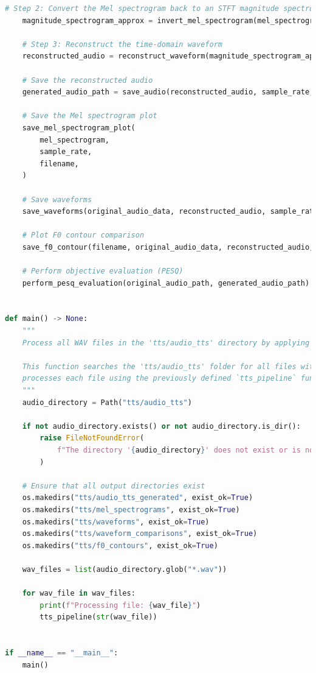 \documentclass[12pt]{article}
\begin{document}
\begin{lstlisting}[language=Python, basicstyle=\fontsize{8}{9}\ttfamily]
    # Step 2: Convert the Mel spectrogram back to an STFT magnitude spectrogram
    magnitude_spectrogram_approx = invert_mel_spectrogram(mel_spectrogram, sample_rate)

    # Step 3: Reconstruct the time-domain waveform
    reconstructed_audio = reconstruct_waveform(magnitude_spectrogram_approx)

    # Save the reconstructed audio
    generated_audio_path = save_audio(reconstructed_audio, sample_rate, filename)

    # Save the Mel spectrogram plot
    save_mel_spectrogram_plot(
        mel_spectrogram,
        sample_rate,
        filename,
    )

    # Save waveforms
    save_waveforms(original_audio_data, reconstructed_audio, sample_rate, filename)

    # Plot F0 contour comparison
    save_f0_contour(filename, original_audio_data, reconstructed_audio, sample_rate)

    # Perform objective evaluation (PESQ)
    perform_pesq_evaluation(original_audio_path, generated_audio_path)


def main() -> None:
    """
    Process all WAV files in the 'tts/audio_tts' directory by applying the tts function to each file.

    This function searches the 'tts/audio_tts' folder for all files with a '.wav' extension and
    processes each file using the previously defined `tts_pipeline` function.
    """
    audio_directory = Path("tts/audio_tts")

    if not audio_directory.exists() or not audio_directory.is_dir():
        raise FileNotFoundError(
            f"The directory '{audio_directory}' does not exist or is not a directory."
        )

    # Ensure that all output directories exist
    os.makedirs("tts/audio_tts_generated", exist_ok=True)
    os.makedirs("tts/mel_spectrograms", exist_ok=True)
    os.makedirs("tts/waveforms", exist_ok=True)
    os.makedirs("tts/waveform_comparisons", exist_ok=True)
    os.makedirs("tts/f0_contours", exist_ok=True)

    wav_files = list(audio_directory.glob("*.wav"))

    for wav_file in wav_files:
        print(f"Processing file: {wav_file}")
        tts_pipeline(str(wav_file))


if __name__ == "__main__":
    main()
\end{lstlisting}
\end{document}
